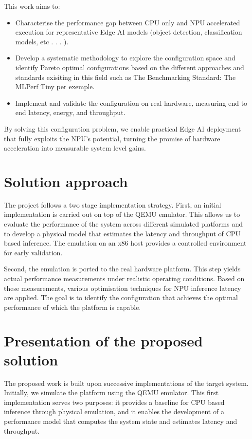 This work aims to:
\begin{itemize}
    \item Characterise the performance gap between CPU only and NPU accelerated execution for representative Edge AI models (object detection, classification models, etc . . . ).
    \item Develop a systematic methodology to explore the configuration space  and identify Pareto optimal configurations based on the different approaches and standards exisiting in this field such as The Benchmarking Standard: The MLPerf Tiny per exemple.
    \item Implement and validate the configuration on real hardware, measuring end to end latency, energy, and throughput.
\end{itemize}
By solving this configuration problem, we enable practical Edge AI deployment that fully exploits the NPU’s potential, turning the promise of hardware acceleration into measurable system level gains.

\section{Solution approach}
The project follows a two stage implementation strategy. First, an initial implementation is carried out on top of the QEMU emulator. This allows us to evaluate the performance of the system across different simulated platforms and to develop a physical model that estimates the latency and throughput of CPU based inference. The emulation on an x86 host provides a controlled environment for early validation.

Second, the emulation is ported to the real hardware platform. This step yields actual performance measurements under realistic operating conditions. Based on these measurements, various optimisation techniques for NPU inference latency are applied. The goal is to identify the configuration that achieves the optimal performance of which the platform is capable.

\section{Presentation of the proposed solution}
The proposed work is built upon successive implementations of the target system. Initially, we simulate the platform using the QEMU emulator. This first implementation serves two purposes: it provides a baseline for CPU based inference through physical emulation, and it enables the development of a performance model that computes the system state and estimates latency and throughput.

